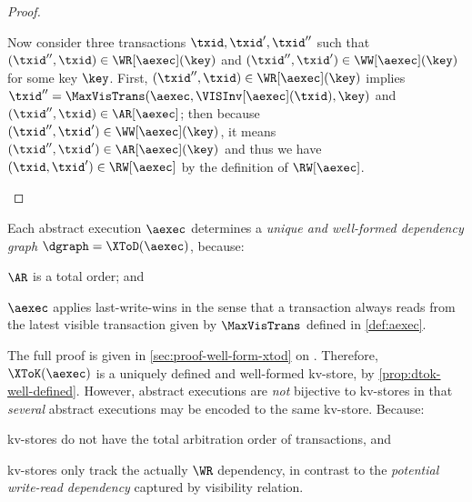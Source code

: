 \begin{toappendix}
\begin{proof}
\begin{enumerate}
    Now consider three transactions \( \txid, \txid', \txid'' \)
    such that \( (\txid'',\txid) \in \WR[\aexec](\key) \) 
    and \( (\txid'',\txid') \in \WW[\aexec](\key) \) for some key \( \key \).
    First, \( (\txid'',\txid) \in \WR[\aexec](\key) \) implies
    \( \txid'' = \MaxVisTrans(\aexec,\VISInv[\aexec](\txid),\key) \) and \( (\txid'',\txid) \in \AR[\aexec] \);
    then because \( (\txid'',\txid') \in \WW[\aexec](\key) \), it means \( (\txid'',\txid') \in \AR[\aexec](\key) \)
    and thus we have \( (\txid,\txid') \in \RW[\aexec] \) by the definition of \( \RW[\aexec]\). \qedhere
\end{enumerate}
\end{proof}
\end{toappendix}


Each abstract execution \(\aexec\) determines a \emph{unique and well-formed dependency graph} \(\dgraph = \XToD(\aexec)\),
because:
\begin{enumerate*}
\item \( \AR \) is a total order; and
\item \( \aexec \) applies last-write-wins in the sense that a transaction always reads from 
the latest visible transaction given by \( \MaxVisTrans \) defined in \cref{def:aexec}.
\end{enumerate*}
The full proof is given in \cref{sec:proof-well-form-xtod} on \pageref{sec:proof-well-form-xtod}.
Therefore, \( \XToK(\aexec) \) is a uniquely defined and well-formed kv-store, by \cref{prop:dtok-well-defined}.
However, abstract executions are \emph{not} bijective to kv-stores
in that \emph{several} abstract executions may be encoded to the same kv-store.
Because: \begin{enumerate*} 
\item kv-stores do not have the total arbitration order of transactions, and
\item kv-stores only track the actually \( \WR \) dependency, 
    in contrast to the \emph{potential write-read dependency} captured by visibility relation.
\end{enumerate*}

